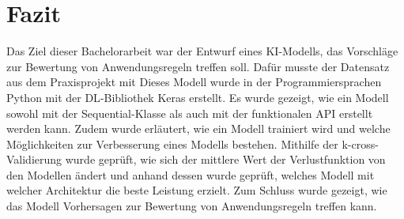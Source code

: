 \chapter{Fazit}
\label{chap:Fazit}
Das Ziel dieser Bachelorarbeit war der Entwurf eines \ac{KI}-Modells, das Vorschläge zur Bewertung von Anwendungsregeln treffen soll.
Dafür musste der Datensatz aus dem Praxisprojekt mit  Dieses Modell wurde
in der Programmiersprachen Python mit der \ac{DL}-Bibliothek Keras erstellt. Es wurde gezeigt, wie ein Modell sowohl mit der \glqq Sequential\grqq{}-Klasse
als auch mit der funktionalen \ac{API} erstellt werden kann. Zudem wurde erläutert, wie ein Modell trainiert wird und welche Möglichkeiten zur Verbesserung eines 
Modells bestehen. Mithilfe der k-cross-Validierung wurde geprüft, wie sich der mittlere Wert der Verlustfunktion von den Modellen ändert und anhand dessen 
wurde geprüft, welches Modell mit welcher Architektur die beste Leistung erzielt. Zum Schluss wurde gezeigt, wie das Modell Vorhersagen zur Bewertung von Anwendungsregeln
treffen kann. 

